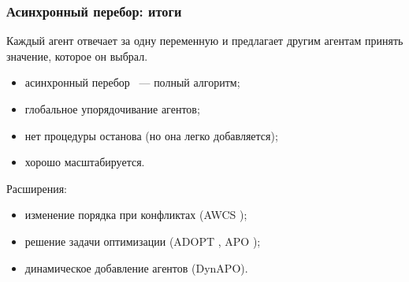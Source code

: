 \documentclass{beamer}
\begin{document}

\begin{frame}
  \frametitle{Асинхронный перебор: итоги}
  Каждый агент отвечает за одну переменную и предлагает другим агентам принять значение,
  которое он выбрал.
  \begin{itemize}
    \item асинхронный перебор \cite{Bessiere2005} ~--- полный алгоритм;
    \item глобальное упорядочивание агентов;
    \item нет процедуры останова (но она легко добавляется);
    \item хорошо масштабируется.
  \end{itemize}

  Расширения:
  \begin{itemize}
    \item изменение порядка при конфликтах (AWCS \cite{Yokoo1995});
    \item решение задачи оптимизации (ADOPT \cite{Modi2003}, APO \cite{Mailler2006});
    \item динамическое добавление агентов (DynAPO).
  \end{itemize}
\end{frame}
\end{document}

